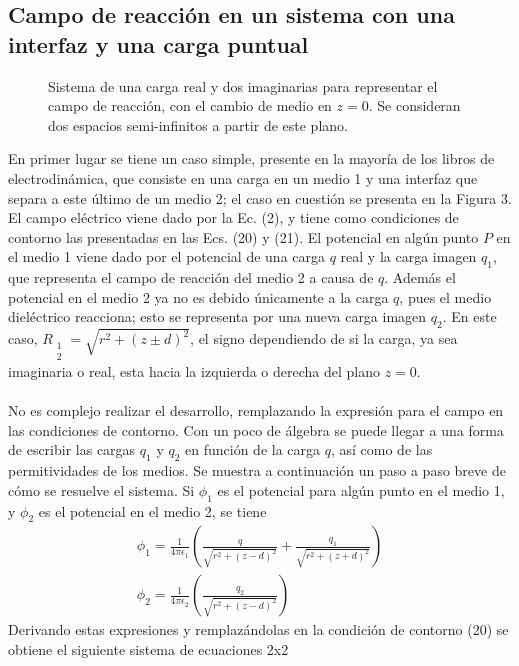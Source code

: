 \documentclass[12pt, notitlepage]{article}
\begin{document}
\subsection{Campo de reacción en un sistema con una interfaz y una carga puntual}
\begin{figure}[H]
\centering

\caption{Sistema de una carga real y dos imaginarias para representar el campo de reacción, con el cambio de medio en $z=0$. Se consideran dos espacios semi-infinitos a partir de este plano.}
\end{figure}
En primer lugar se tiene un caso simple, presente en la mayoría de los libros de electrodinámica, que consiste en una carga en un medio 1 y una interfaz que separa a este último de un medio 2; el caso en cuestión se presenta en la Figura 3. El campo eléctrico viene dado por la Ec. (2), y tiene como condiciones de contorno las presentadas en las Ecs. (20) y (21).
El potencial en algún punto $P$ en el medio 1 viene dado por el potencial de una carga $q$ real y la carga imagen $q_1$, que representa el campo de reacción del medio 2 a causa de $q$. Además el potencial en el medio 2 ya no es debido únicamente a la carga $q$, pues el medio dieléctrico reacciona; esto se representa por una nueva carga imagen $q_2$. En este caso, $R_{\substack{1\\2}} = \sqrt{r^2 + (z\pm d)^2}$, el signo dependiendo de si la carga, ya sea imaginaria o real, esta hacia la izquierda o derecha del plano $z=0$.\\\\
No es complejo realizar el desarrollo, remplazando la expresión para el campo en las condiciones de contorno. Con un poco de álgebra se puede llegar a una forma de escribir las cargas $q_1$ y $q_2$ en función de la carga $q$, así como de las permitividades de los medios. Se muestra a continuación un paso a paso breve de cómo se resuelve el sistema. Si $\phi_1$ es el potencial para algún punto en el medio 1, y $\phi_2$ es el potencial en el medio 2, se tiene
\begin{gather}
\phi_1 = \frac{1}{4\pi\epsilon_1}\left(\frac{q}{\sqrt{r^2+(z-d)^2}}+\frac{q_1}{\sqrt{r^2+(z+d)^2}}\right)\\
\phi_2 = \frac{1}{4\pi\epsilon_2}\left(\frac{q_2}{\sqrt{r^2+(z-d)^2}}\right)
\end{gather}
Derivando estas expresiones y remplazándolas en la condición de contorno (20) se obtiene el siguiente sistema de ecuaciones 2x2\\
\end{document}
